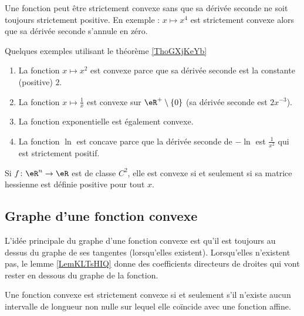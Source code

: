 \begin{remark}
    Une fonction peut être strictement convexe sans que sa dérivée seconde ne soit toujours strictement positive. En exemple : \( x\mapsto x^4\) est strictement convexe alors que sa dérivée seconde s'annule en zéro.
\end{remark}

\begin{example} \label{ExPDRooZCtkOz}
    Quelques exemples utilisant le théorème \ref{ThoGXjKeYb}
    \begin{enumerate}
        \item
    La fonction \( x\mapsto x^2\) est convexe parce que sa dérivée seconde est la constante (positive) \( 2\).
\item La fonction \( x\mapsto\frac{1}{ x }\) est convexe sur \( \eR^+\setminus\{ 0 \}\) (sa dérivée seconde est \( 2x^{-3}\)).
\item
    La fonction exponentielle est également convexe.
\item
    La fonction \( \ln\) est concave parce que la dérivée seconde de \( -\ln\) est \( \frac{1}{ x^2 }\) qui est strictement positif.
    \end{enumerate}
\end{example}

\begin{proposition} \label{PropHRLooTqIJPS}
    Si \( f\colon \eR^n\to \eR\) est de classe \( C^2\), elle est convexe si et seulement si sa matrice hessienne est définie positive pour tout \( x\).
\end{proposition}

\subsection{Graphe d'une fonction convexe}

L'idée principale du graphe d'une fonction convexe est qu'il est toujours au dessus du graphe de ses tangentes (lorsqu'elles existent). Lorsqu'elles n'existent pas, le lemme \ref{LemKLTsHIQ} donne des coefficients directeurs de droites qui vont rester en dessous du graphe de la fonction.

\begin{proposition}      \label{PROPooOCOEooEGybmS}
    Une fonction convexe est strictement convexe si et seulement s'il n'existe aucun intervalle de longueur non nulle sur lequel elle coïncide avec une fonction affine.
\end{proposition}

